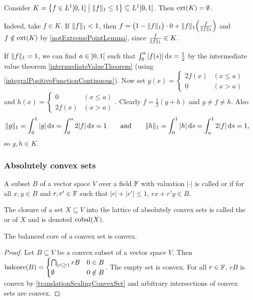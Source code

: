 \begin{example}
Consider $K = \setbuilder{f\in L^1\interval{0,1}}{\norm{f}_1 \leq 1} \subseteq L^1\interval{0,1}$. Then $\operatorname{ext}(K) = \emptyset$.

Indeed, take $f\in K$. If $\lVert f\rVert_1 < 1$, then $f = \big(1-\lVert f\rVert_1\big)\cdot 0 + \lVert f\rVert_1\Big(\frac{f}{\lVert f\rVert_1}\Big)$ and $f\notin \operatorname{ext}(K)$ by \ref{notExtremePointLemma}, since $\frac{f}{\lVert f\rVert_1}\in K$.

If $\lVert f\rVert_1 = 1$, we can find $a\in \interval[o]{0,1}$ such that $\int_0^a |f(s)| \operatorname{d \!}{s} = \frac{1}{2}$ by the intermediate value theorem \ref{intermediateValueTheorem} (using \ref{integralPositiveFunctionContinuous}). Now set $g(x) = \begin{cases}
2f(x) & (x\leq a) \\ 0 & (x>a)
\end{cases}$ and $h(x) = \begin{cases}
0 & (x\leq a) \\ 2f(x) & (x>a)
\end{cases}$. Clearly $f = \frac{1}{2}(g+h)$ and $g\neq f\neq h$. Also
\[ \lVert g\rVert_1 = \int_0^1 |g| \operatorname{d \!}{s} = \int_0^a 2|f|\operatorname{d \!}{s} = 1 \qquad\text{and}\qquad \lVert h\rVert_1 = \int_0^1 |h| \operatorname{d \!}{s} = \int_a^1 2|f|\operatorname{d \!}{s} = 1, \]
so $g,h\in K$.
\end{example}


\subsubsection{Absolutely convex sets}
\begin{definition}
A subset $B$ of a vector space $V$ over a field $\mathbb{F}$ with valuation $|\cdot|$ is called  or  if for all $x,y\in B$ and $r,r'\in \mathbb{F}$ such that $|r| + |r'| \leq 1$, $rx + r'y\in B$.

The closure of a set $X\subseteq V$ into the lattice of absolutely convex sets is called the  or  of $X$ and is denoted $\operatorname{cobal}(X)$.
\end{definition}

\begin{lemma} \label{balancedCoreConvexSet}
The balanced core of a convex set is convex.
\end{lemma}
\begin{proof}
Let $B\subseteq V$ be a convex subset of a vector space $V$. Then
$\operatorname{balcore}(B) = \begin{cases}
\bigcap_{|r|\geq 1}rB & 0\in B\\
\emptyset & 0\notin B
\end{cases}$. The empty set is convex. For all $r\in \mathbb{F}$, $rB$ is convex by \ref{translationScalingConvexSet} and arbitrary intersections of convex sets are convex.
\end{proof}

